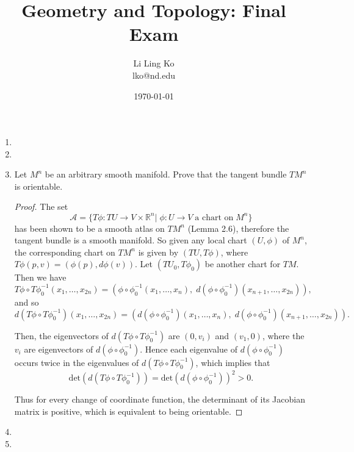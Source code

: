 \documentclass{article}
\begin{document}
\title{Geometry and Topology: Final Exam}
\author{Li Ling Ko\\ lko@nd.edu}
\date{\today}
\maketitle

\begin{enumerate}[label={\bf Q\arabic*:}]
  \item

  \item

  \item Let $M^n$ be an arbitrary smooth manifold. Prove that the tangent
    bundle $TM^n$ is orientable.

    \begin{proof}
      The set 
      \[\mathcal{A} = \{T\phi:TU\rightarrow V\times\mathbb{R}^n|\;
        \phi:U\rightarrow V\; \text{a chart on}\; M^n\}\]
      has been shown to be a smooth atlas on $TM^n$ (Lemma 2.6), therefore
      the tangent bundle is a smooth manifold. So given any local chart
      $(U,\phi)$ of $M^n$, the corresponding chart on $TM^n$ is given by
      $(TU,T\phi)$, where $T\phi(p,v)=(\phi(p),d\phi(v))$. Let
      $(TU_0,T\phi_0)$ be another chart for $TM$. Then we have
      \[T\phi\circ T\phi_0^{-1}(x_1,\ldots,x_{2n})
        =(\phi\circ\phi_0^{-1}(x_1,\ldots,x_n),\; d(\phi\circ\phi_0^{-1})
        (x_{n+1},\ldots,x_{2n})),\]
      and so
      \[d(T\phi\circ T\phi_0^{-1})(x_{1},\ldots,x_{2n})
        =(d(\phi\circ\phi_0^{-1})(x_{1},\ldots,x_{n}),\;
        d(\phi\circ\phi_0^{-1})(x_{n+1},\ldots,x_{2n})).\]

      Then, the eigenvectors of $d(T\phi\circ T\phi_0^{-1})$ are $(0,v_i)$
      and $(v_1,0)$, where the $v_i$ are eigenvectors of
      $d(\phi\circ\phi_0^{-1})$. Hence each eigenvalue of
      $d(\phi\circ\phi_0^{-1})$ occurs twice in the eigenvalues of
      $d(T\phi\circ T\phi_0^{-1})$, which implies that
      \[\text{det}(d(T\phi\circ T\phi_0^{-1}))
      =\text{det}(d(\phi\circ\phi_0^{-1}))^2 >0.\]

      Thus for every change of coordinate function, the determinant of its
      Jacobian matrix is positive, which is equivalent to being orientable.
    \end{proof}

  \item

  \item
\end{enumerate}
\end{document}
